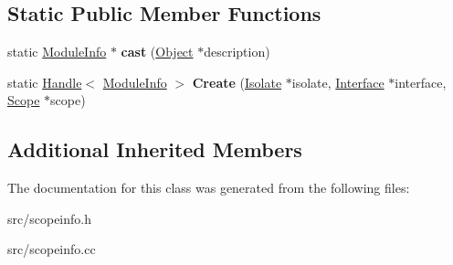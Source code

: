 \subsection*{Static Public Member Functions}
\begin{DoxyCompactItemize}
\item 
\hypertarget{classv8_1_1internal_1_1_module_info_a43f619b534925ef73d217c2d202b9bc4}{}static \hyperlink{classv8_1_1internal_1_1_module_info}{Module\+Info} $\ast$ {\bfseries cast} (\hyperlink{classv8_1_1internal_1_1_object}{Object} $\ast$description)\label{classv8_1_1internal_1_1_module_info_a43f619b534925ef73d217c2d202b9bc4}

\item 
\hypertarget{classv8_1_1internal_1_1_module_info_a17eb6e62b16425adc1ce9e89b6985614}{}static \hyperlink{classv8_1_1internal_1_1_handle}{Handle}$<$ \hyperlink{classv8_1_1internal_1_1_module_info}{Module\+Info} $>$ {\bfseries Create} (\hyperlink{classv8_1_1internal_1_1_isolate}{Isolate} $\ast$isolate, \hyperlink{classv8_1_1internal_1_1_interface}{Interface} $\ast$interface, \hyperlink{classv8_1_1internal_1_1_scope}{Scope} $\ast$scope)\label{classv8_1_1internal_1_1_module_info_a17eb6e62b16425adc1ce9e89b6985614}

\end{DoxyCompactItemize}
\subsection*{Additional Inherited Members}


The documentation for this class was generated from the following files\+:\begin{DoxyCompactItemize}
\item 
src/scopeinfo.\+h\item 
src/scopeinfo.\+cc\end{DoxyCompactItemize}
